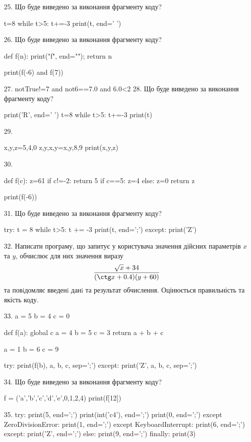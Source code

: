 \documentclass[11pt]{article}
\begin{document}
25. Що буде виведено за виконання фрагменту коду?

t=8
while t>5:
    t+=-3
print(t, end=' ')


26. Що буде виведено за виконання фрагменту коду?

def f(n):
    print("f", end="");
    return n

print(f(-6) and f(7))

27. 
notTrue!=7 and not6==7.0 and 6.0<2
28. Що буде виведено за виконання фрагменту коду?

print('R', end=' ')
t=8
while t>5:
    t+=-3
print(t)


29. 

x,y,z=5,4,0
z,y,x,y=x,y,8,9
print(x,y,z)

30. 

def f(c):
    z=61
    if c!=-2: 
        return 5
    if c==5:
         z=4
    else:
         z=0
    return z

print(f(-6))

31. Що буде виведено за виконання фрагменту коду?

try:
    t = 8
    while t>5:
        t += -3
    print(t, end=';')
except:
    print('Z')


32. 
Написати програму, що запитує у користувача значення дійсних параметрів $x$ та $y$, обчислює для них значення виразу 
$$\frac{\sqrt x + 34}{(\ctg x + 0.4) (y + 60)}$$ 
та повiдомляє введенi данi та результат обчислення.
 Оцінюється правильність та якість коду.


33. 
a = 5
b = 4
c = 0

def f(a):
global c    a = 4
    b = 5
    c = 3
    return a + b + c

a = 1
b = 6
c = 9

try:
    print(f(b), a, b, c, sep=';')
except:
    print('Z', a, b, c, sep=';')

34. Що буде виведено за виконання фрагменту коду?

f = ('a','b','c','d','e',0,1,2,4)
print(f[12])


35. 
try:
    print(5, end=';')
    print(int('c4'), end=';')
    print(0, end=';')
except ZeroDivisionError:
    print(1, end=';')
except KeyboardInterrupt:
    print(6, end=';')
except:
    print('Z', end=';')
else:
    print(9, end=';')
finally:
    print(3)
\end{document}
